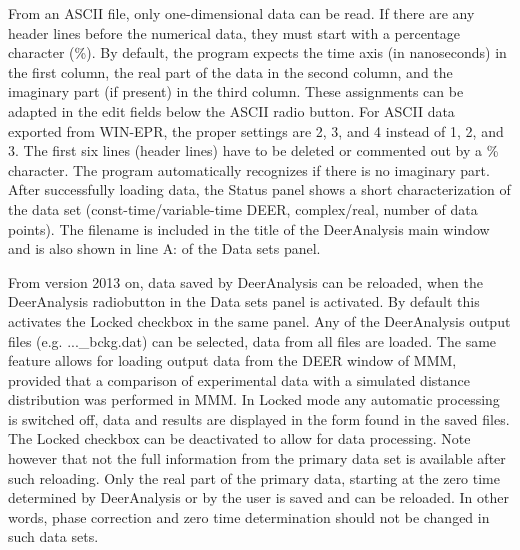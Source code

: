 \documentclass{article}
\begin{document}
From an ASCII file, only one-dimensional data can be read. If there are
any header lines before the numerical data, they must start with a percentage
character (\%). By default, the program expects the time axis (in nanoseconds)
in the first column, the real part of the data in the second column, and the
imaginary part (if present) in the third column. These assignments can be
adapted in the edit fields below the {\ttfamily ASCII} radio button. For ASCII data
exported from WIN-EPR, the proper settings are 2, 3, and 4 instead of 1, 2,
and 3. The first six lines (header lines) have to be deleted or commented out by
a \% character. The program automatically recognizes if there is no imaginary
part. After successfully loading data, the {\ttfamily Status} panel shows a short characterization of the data set (const-time/variable-time
DEER, complex/real, number of data points). The filename is included in the
title of the DeerAnalysis main window and is also shown in line {\ttfamily A:} of the {\ttfamily Data sets} panel.

From version 2013 on, data saved by DeerAnalysis can be reloaded, when the {\ttfamily DeerAnalysis} radiobutton in the {\ttfamily Data sets} panel is activated. By default this activates the {\ttfamily Locked} checkbox in the same panel. Any of the DeerAnalysis output files (e.g. {\ttfamily ...\_bckg.dat}) can be selected, data from all files are loaded. The same feature allows for loading output data from the DEER window of MMM, provided that a comparison of experimental data with a simulated distance distribution was performed in MMM. In {\ttfamily Locked} mode any automatic processing is switched off, data and results are displayed in the form found in the saved files. The {\ttfamily Locked} checkbox can be deactivated to allow for data processing. Note however that not the full information from the primary data set is available after such reloading. Only the real part of the primary data, starting at the zero time determined by DeerAnalysis or by the user is saved and can be reloaded. In other words, phase correction and zero time determination should not be changed in such data sets.
\end{document}
